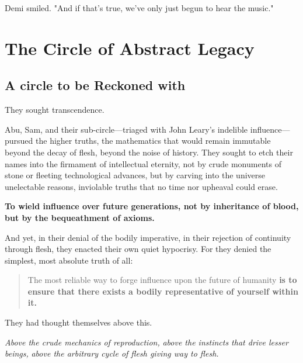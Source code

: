 Demi smiled. "And if that’s true, we’ve only just begun to hear the music."


\section*{The Circle of Abstract Legacy}
\subsection*{A circle to be Reckoned with}


They sought transcendence.

Abu, Sam, and their sub-circle—triaged with John Leary’s indelible influence—pursued the higher truths, the mathematics that would remain immutable beyond the decay of flesh, beyond the noise of history. They sought to etch their names into the firmament of intellectual eternity, not by crude monuments of stone or fleeting technological advances, but by carving into the universe unelectable reasons, inviolable truths that no time nor upheaval could erase.

\bigskip

\textbf{To wield influence over future generations, not by inheritance of blood, but by the bequeathment of axioms.}

\bigskip

And yet, in their denial of the bodily imperative, in their rejection of continuity through flesh, they enacted their own quiet hypocrisy. For they denied the simplest, most absolute truth of all:

\begin{quote}
The most reliable way to forge influence upon the future of humanity  
\textbf{is to ensure that there exists a bodily representative of yourself within it.}
\end{quote}

\bigskip


They had thought themselves above this.

\bigskip

\textit{Above the crude mechanics of reproduction,}  
\textit{above the instincts that drive lesser beings,}  
\textit{above the arbitrary cycle of flesh giving way to flesh.}  

\bigskip

